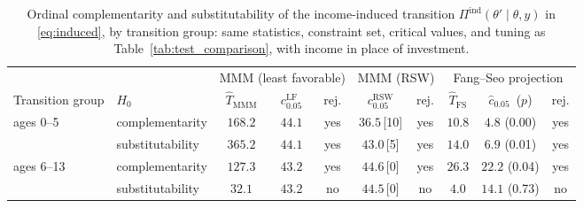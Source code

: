 \begin{table}[htbp]
\centering\small
\begin{tabular}{@{}llcccccccc@{}}
\toprule
 & & \multicolumn{3}{c}{MMM (least favorable)} & \multicolumn{2}{c}{MMM (RSW)} & \multicolumn{3}{c}{Fang--Seo projection} \\
\cmidrule(lr){3-5}\cmidrule(lr){6-7}\cmidrule(lr){8-10}
Transition group & $H_0$ & $\hat T_{\mathrm{MMM}}$ & $c^{\mathrm{LF}}_{0.05}$ & rej. & $c^{\mathrm{RSW}}_{0.05}$ & rej. & $\hat T_{\mathrm{FS}}$ & $\hat c_{0.05}$ \,($p$) & rej. \\ \midrule
ages 0--5 & complementarity & $168.2$ & $44.1$ & yes & $36.5$\,[10] & yes & $10.8$ & $4.8$ (0.00) & yes \\
 & substitutability & $365.2$ & $44.1$ & yes & $43.0$\,[5] & yes & $14.0$ & $6.9$ (0.01) & yes \\
\midrule
ages 6--13 & complementarity & $127.3$ & $43.2$ & yes & $44.6$\,[0] & yes & $26.3$ & $22.2$ (0.04) & yes \\
 & substitutability & $32.1$ & $43.2$ & no & $44.5$\,[0] & no & $4.0$ & $14.1$ (0.73) & no \\
\bottomrule
\end{tabular}
\caption{Ordinal complementarity and substitutability of the income-induced transition $\Pi^{\mathrm{ind}}(\theta'\mid\theta,y)$ in \eqref{eq:induced}, by transition group: same statistics, constraint set, critical values, and tuning as Table~\ref{tab:test_comparison}, with income in place of investment.}
\label{tab:test_comparison_induced}
\end{table}
